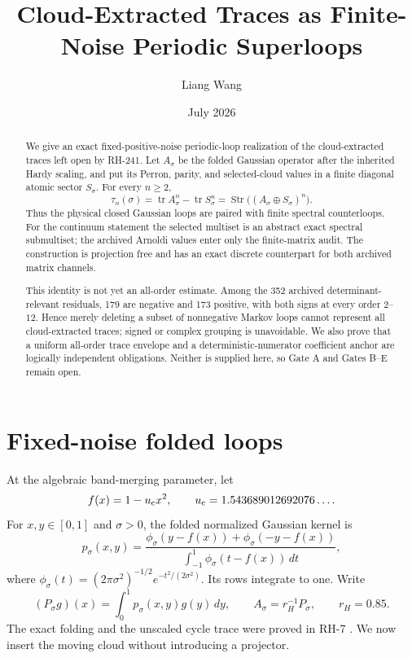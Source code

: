 \documentclass[11pt]{article}
\title{Cloud-Extracted Traces as Finite-Noise Periodic Superloops}
\author{Liang Wang}
\date{July 2026}
\theoremstyle{remark}
\newcommand{\Tr}{\operatorname{tr}}
\newcommand{\Str}{\operatorname{Str}}
\begin{document}
\maketitle

\begin{abstract}
We give an exact fixed-positive-noise periodic-loop realization of the
cloud-extracted traces left open by RH-241.  Let $A_\sigma$ be the folded
Gaussian operator after the inherited Hardy scaling, and put its Perron,
parity, and selected-cloud values in a finite diagonal atomic sector
$S_\sigma$.  For every $n\ge2$,
\[
 \tau_n(\sigma)
 =\Tr A_\sigma^n-\Tr S_\sigma^n
 =\Str\bigl((A_\sigma\oplus S_\sigma)^n\bigr).
\]
Thus the physical closed Gaussian loops are paired with finite spectral
counterloops.  For the continuum statement the selected multiset is an
abstract exact spectral submultiset; the archived Arnoldi values enter only
the finite-matrix audit.  The construction is projection free and has an
exact discrete counterpart for both archived matrix channels.

This identity is not yet an all-order estimate.  Among the 352 archived
determinant-relevant residuals, 179 are negative and 173 positive, with both
signs at every order $2$--$12$.  Hence merely deleting a subset of
nonnegative Markov loops cannot represent all cloud-extracted traces; signed
or complex grouping is unavoidable.  We also prove that a uniform all-order
trace envelope and a deterministic-numerator coefficient anchor are
logically independent obligations.  Neither is supplied here, so Gate A and
Gates B--E remain open.
\end{abstract}

\section{Fixed-noise folded loops}

At the algebraic band-merging parameter, let
\[
 f(x)=1-u_{\rm c}x^2,
 \qquad u_{\rm c}=1.543689012692076\ldots .
\]
For $x,y\in[0,1]$ and $\sigma>0$, the folded normalized Gaussian kernel is
\begin{equation}\label{eq:kernel}
 p_\sigma(x,y)=\frac{\phi_\sigma(y-f(x))+\phi_\sigma(-y-f(x))}
 {\int_{-1}^{1}\phi_\sigma(t-f(x))\,dt},
\end{equation}
where $\phi_\sigma(t)=(2\pi\sigma^2)^{-1/2}
e^{-t^2/(2\sigma^2)}$.  Its rows integrate to one.  Write
\[
 (P_\sigma g)(x)=\int_0^1p_\sigma(x,y)g(y)\,dy,
 \qquad A_\sigma=r_H^{-1}P_\sigma,
 \qquad r_H=0.85.
\]
The exact folding and the unscaled cycle trace were proved in RH-7
\citep{WangRH7}.  We now insert the moving cloud without introducing a
projector.
\end{document}
